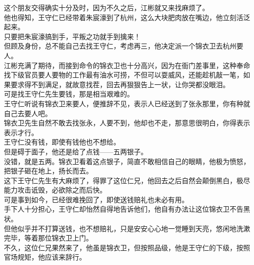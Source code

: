 \begin{multicols}{\theparacolNo}
这个朋友交得确实十分及时，因为不久之后，江彬就又来找麻烦了。\\

他也得知，王守仁已经带着朱宸濠到了杭州，这么大块肥肉放在嘴边，他立刻活泛起来。\\

只要把朱宸濠搞到手，平叛之功就手到擒来！\\

但顾及身份，总不能自己去找王守仁，考虑再三，他决定派一个锦衣卫去杭州要人。\\

江彬充满了期待，而接到命令的锦衣卫也十分高兴，因为在衙门差事里，这种奉命找下级官员要人要物的工作最有油水可捞，不但可以耍威风，还能趁机敲一笔，如果要求得不到满足，就故意找茬，回去再狠狠告上一状，让你哭都没眼泪。\\

可是找王守仁先生要钱，那是相当艰难的。\\

王守仁听说有锦衣卫来要人，便推辞不见，表示人已经送到了张永那里，你有种就自己去要人吧。\\

锦衣卫先生自然不敢去找张永，人要不到，他却也不走，那意思很明白，你得表示表示才行。\\

王守仁没有钱，即使有钱他也不想给。\\

但是碍于面子，他还是给了点钱——五两银子。\\

没错，就是五两。锦衣卫看着这点银子，简直不敢相信自己的眼睛，他极为愤怒，把银子砸在地上，扬长而去。\\

这下王守仁先生有大麻烦了，得罪了这位仁兄，他回去之后自然会颠倒黑白，极尽能力攻击诋毁，必欲除之而后快。\\

可是事到如今，已经很难挽回了，即使送钱赔礼也未必有用。\\

手下人十分担心，王守仁却怡然自得地告诉他们，他自有办法让这位锦衣卫不告黑状。\\

但他似乎并不打算送钱，也不想赔礼，只是安安心心地一觉睡到天亮，悠闲地洗漱完毕，等着那位锦衣卫上门。\\

不久，这位仁兄果然来了，他虽是锦衣卫，但按照品级，他是王守仁的下级，按照官场规矩，他应该来辞行。\\


\end{multicols}
